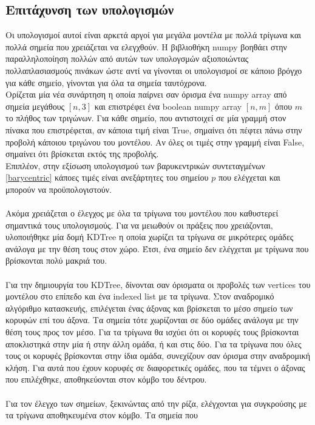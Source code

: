 \documentclass{report}
\begin{document}
\subsection{Επιτάχυνση των υπολογισμών}
Οι υπολογισμοί αυτοί είναι αρκετά αργοί για μεγάλα μοντέλα με πολλά τρίγωνα και πολλά σημεία που χρειάζεται να ελεγχθούν.
Η βιβλιοθήκη numpy βοηθάει στην παραλληλοποίηση πολλών από αυτών των υπολογσμών αξιοποιώντας πολλαπλασιασμούς πινάκων ώστε
αντί να γίνονται οι υπολογισμοί σε κάποιο βρόγχο για κάθε σημείο, γίνονται για όλα τα σημεία ταυτόχρονα.\\
Ορίζεται μία νέα συνάρτηση η οποία παίρνει σαν όρισμα ένα numpy array από σημεία μεγάθους $\left[n, 3\right]$ και επιστρέφει
ένα boolean numpy array $\left[n, m\right]$ όπου $m$ το πλήθος των τριγώνων. Για κάθε σημείο, που αντιστοιχεί σε μία γραμμή στον πίνακα
που επιστρέφεται, αν κάποια τιμή είναι True, σημαίνει ότι πέφτει πάνω στην προβολή κάποιου τριγώνου του μοντέλου. Αν όλες οι τιμές στην γραμμή
είναι False, σημαίνει ότι βρίσκεται εκτός της προβολής.
\\
Επιπλέον, στην εξίσωση υπολογισμού των βαρυκεντρικών συντεταγμένων \eqref{barycentric} κάποες τιμές είναι ανεξάρτητες
του σημείου $p$ που ελέγχεται και μπορούν να προϋπολογιστούν.
\\\\
Ακόμα χρειάζεται ο έλεγχος με όλα τα τρίγωνα του μοντέλου που καθυστερεί σημαντικά τους υπολογισμούς. Για να μειωθούν οι πράξεις που
χρειάζονται, υλοποιήθηκε μία δομή KDTree η οποία χωρίζει τα τρίγωνα σε μικρότερες ομάδες ανάλογα με την θέση τους στον χώρο. Έτσι, ένα
σημείο δεν ελέγχεται με τρίγωνα που βρίσκονται πολύ μακριά του.
\\\\
Για την δημιουργία του KDTree, δίνονται σαν όρισματα οι προβολές των vertices του μοντέλου στο επίπεδο και ένα indexed list
με τα τρίγωνα. Στον αναδρομικό αλγόριθμο κατασκευής, επιλέγεται ένας άξονας και βρίσκεται το μέσο σημείο των κορυφών επί του άξονα.
Τα σημεία τότε χωρίζονται σε δύο ομάδες ανάλογα με την θέση τους προς τον μέσο. Για τα τρίγωνα θα ισχύει ότι οι κορυφές τους βρίσκονται
αποκλιστηκά στην μία ή στην άλλη ομάδα, ή και στις δύο. Για τα τρίγωνα που όλες τους οι κορυφές βρίσκονται στην ίδια ομάδα, συνεχίζουν
σαν όρισμα στην αναδρομική κλήση. Για αυτά που έχουν κορυφές σε διαφορετικές ομάδες, που τα τέμνει ο άξονας που επιλέχθηκε, αποθηκεύονται
στον κόμβο του δέντρου.
\\\\
Για τον έλεγχο των σημείων, ξεκινώντας από την ρίζα, ελέγχονται για συγκρούσης με τα τρίγωνα αποθηκευμένα στον κόμβο. Τα σημεία που
\end{document}
